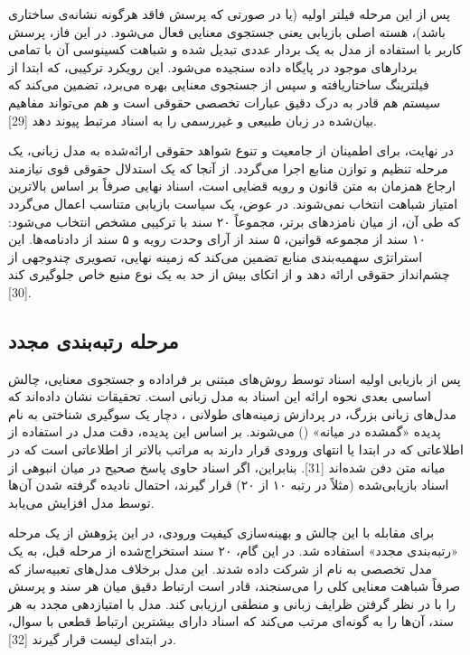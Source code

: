 \documentclass[12pt,a4paper]{report}
\begin{document}
	پس از این مرحله فیلتر اولیه (یا در صورتی که پرسش فاقد هرگونه نشانه‌ی ساختاری باشد)، هسته اصلی بازیابی یعنی جستجوی معنایی فعال می‌شود. در این فاز، پرسش کاربر با استفاده از مدل  به یک بردار عددی تبدیل شده و شباهت کسینوسی آن با تمامی بردارهای موجود در پایگاه داده سنجیده می‌شود. این رویکرد ترکیبی، که ابتدا از فیلترینگ ساختاریافته و سپس از جستجوی معنایی بهره می‌برد، تضمین می‌کند که سیستم هم قادر به درک دقیق عبارات تخصصی حقوقی است و هم می‌تواند مفاهیم بیان‌شده در زبان طبیعی و غیررسمی را به اسناد مرتبط پیوند دهد [29].
	
	در نهایت، برای اطمینان از جامعیت و تنوع شواهد حقوقی ارائه‌شده به مدل زبانی، یک مرحله تنظیم و توازن منابع اجرا می‌گردد. از آنجا که یک استدلال حقوقی قوی نیازمند ارجاع همزمان به متن قانون و رویه قضایی است، اسناد نهایی صرفاً بر اساس بالاترین امتیاز شباهت انتخاب نمی‌شوند. در عوض، یک سیاست بازیابی متناسب اعمال می‌گردد که طی آن، از میان نامزدهای برتر، مجموعاً ۲۰ سند با ترکیبی مشخص انتخاب می‌شود: ۱۰ سند از مجموعه قوانین، ۵ سند از آرای وحدت رویه و ۵ سند از دادنامه‌ها. این استراتژی سهمیه‌بندی منابع تضمین می‌کند که زمینه نهایی، تصویری چندوجهی از چشم‌انداز حقوقی ارائه دهد و از اتکای بیش از حد به یک نوع منبع خاص جلوگیری کند [30].
	
	\subsection{مرحله رتبه‌بندی مجدد}
	
	پس از بازیابی اولیه اسناد توسط روش‌های مبتنی بر فراداده و جستجوی معنایی، چالش اساسی بعدی نحوه ارائه این اسناد به مدل زبانی است. تحقیقات نشان داده‌اند که مدل‌های زبانی بزرگ، در پردازش زمینه‌های طولانی ، دچار یک سوگیری شناختی به نام پدیده «گمشده در میانه» () می‌شوند. بر اساس این پدیده، دقت مدل در استفاده از اطلاعاتی که در ابتدا یا انتهای ورودی قرار دارند به مراتب بالاتر از اطلاعاتی است که در میانه متن دفن شده‌اند [31]. بنابراین، اگر اسناد حاوی پاسخ صحیح در میان انبوهی از اسناد بازیابی‌شده (مثلاً در رتبه ۱۰ از ۲۰) قرار گیرند، احتمال نادیده گرفته شدن آن‌ها توسط مدل افزایش می‌یابد.
	
	برای مقابله با این چالش و بهینه‌سازی کیفیت ورودی، در این پژوهش از یک مرحله «رتبه‌بندی مجدد»  استفاده شد. در این گام، ۲۰ سند استخراج‌شده از مرحله قبل، به یک مدل تخصصی به نام  از شرکت  داده شدند. این مدل برخلاف مدل‌های تعبیه‌ساز که صرفاً شباهت معنایی کلی را می‌سنجند، قادر است ارتباط دقیق میان هر سند و پرسش را با در نظر گرفتن ظرایف زبانی و منطقی ارزیابی کند. مدل  با امتیازدهی مجدد به هر سند، آن‌ها را به گونه‌ای مرتب می‌کند که اسناد دارای بیشترین ارتباط قطعی با سوال، در ابتدای لیست قرار گیرند [32].
	
\end{document}
